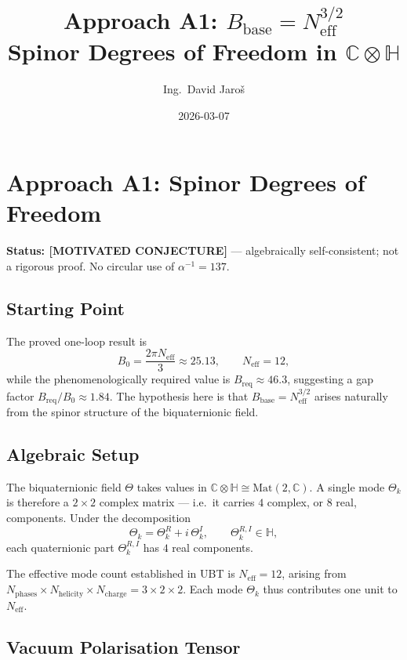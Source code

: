 \documentclass[11pt,a4paper]{article}
\title{Approach A1: $B_{\mathrm{base}} = N_{\mathrm{eff}}^{3/2}$\\
    \large Spinor Degrees of Freedom in $\mathbb{C}\otimes\mathbb{H}$}
\author{Ing.\ David Jaroš}
\date{2026-03-07}
\theoremstyle{remark}
\begin{document}
  \maketitle
\fi

\section{Approach A1: Spinor Degrees of Freedom}
\label{sec:spinor_approach}

\textbf{Status: [MOTIVATED CONJECTURE]} — algebraically self-consistent;
not a rigorous proof. No circular use of $\alpha^{-1} = 137$.

\subsection{Starting Point}

The proved one-loop result is
\begin{equation}
  B_0 = \frac{2\pi N_{\mathrm{eff}}}{3} \approx 25.13,
  \qquad N_{\mathrm{eff}} = 12,
  \label{eq:B0}
\end{equation}
while the phenomenologically required value is $B_{\mathrm{req}} \approx 46.3$,
suggesting a gap factor $B_{\mathrm{req}} / B_0 \approx 1.84$.
The hypothesis here is that $B_{\mathrm{base}} = N_{\mathrm{eff}}^{3/2}$ arises
naturally from the spinor structure of the biquaternionic field.

\subsection{Algebraic Setup}

The biquaternionic field $\Theta$ takes values in $\mathbb{C}\otimes\mathbb{H}
\cong \mathrm{Mat}(2,\mathbb{C})$.  A single mode $\Theta_k$ is therefore
a $2\times 2$ complex matrix — i.e.\ it carries $4$ complex, or
$8$ real, components.  Under the decomposition
\begin{equation}
  \Theta_k = \Theta_k^R + i\,\Theta_k^I,
  \qquad \Theta_k^{R,I} \in \mathbb{H},
\end{equation}
each quaternionic part $\Theta_k^{R,I}$ has $4$ real components.

The effective mode count established in UBT is $N_{\mathrm{eff}} = 12$, arising
from $N_{\mathrm{phases}} \times N_{\mathrm{helicity}} \times N_{\mathrm{charge}}
= 3 \times 2 \times 2$.  Each mode $\Theta_k$ thus contributes one unit to
$N_{\mathrm{eff}}$.

\subsection{Vacuum Polarisation Tensor}
\end{document}
